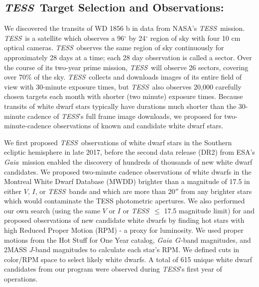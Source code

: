 \documentclass{nature3}
\newcommand{\project}[1]{\textsl{#1}}
\newcommand{\Gaia}{\project{Gaia}}
\newcommand{\TESS}{\project{TESS}}
\begin{document}
\newpage
\begin{methods}

\renewcommand{\figurename}{Extended Data Figure}
\renewcommand{\tablename}{Extended Data Table}
\setcounter{table}{0}  
\setcounter{figure}{0}  

\subsection{\TESS\ Target Selection and Observations:}
We discovered the transits of WD 1856 b in data from NASA's \TESS\ mission\cite{ricker2015}. \TESS\ is a satellite which observes a 96$^\circ$ by 24$^\circ$ region of sky with four 10 cm optical cameras. \TESS\ observes the same region of sky continuously for approximately 28 days at a time; each 28 day observation is called a sector. Over the course of its two-year prime mission, \TESS\ will observe 26 sectors, covering over 70\% of the sky. \TESS\ collects and downloads images of its entire field of view with 30-minute exposure times, but \TESS\ also observes 20,000 carefully chosen targets each month with shorter (two minute) exposure times. Because transits of white dwarf stars typically have durations much shorter than the 30-minute cadence of \TESS's full frame image downloads, we proposed for two-minute-cadence observations of known and candidate white dwarf stars.

We first proposed \TESS\ observations of white dwarf stars in the Southern ecliptic hemisphere in late 2017, before the second data release (DR2) from ESA's \Gaia\ mission  enabled the discovery of hundreds of thousands of new white dwarf candidates. We proposed two-minute cadence observations of white dwarfs in the Montreal White Dwarf Database (MWDD)\cite{dufour} brighter than a magnitude of 17.5 in either $V$, $I$, or \TESS\ bands and which are more than 20$''$ from any brighter stars which would contaminate the TESS photometric apertures. We also performed our own search (using the same $V$ or $I$ or \TESS\ $\leq$ 17.5 magnitude limit) for and proposed observations of new candidate white dwarfs by finding hot stars with high Reduced Proper Motion (RPM) - a proxy for luminosity\cite{gould2003}. We used proper motions from the Hot Stuff for One Year catalog\cite{altmann}, \Gaia\ $G$-band magnitudes, and 2MASS $J$-band magnitudes to calculate each star’s RPM. We defined cuts in color/RPM space to select likely white dwarfs. A total of 615 unique white dwarf candidates from our program were observed during \TESS's first year of operations. 


\end{methods}
\end{document}

